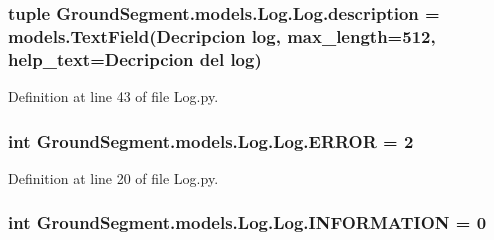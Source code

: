 \subsubsection[{description}]{\setlength{\rightskip}{0pt plus 5cm}tuple Ground\+Segment.\+models.\+Log.\+Log.\+description = models.\+Text\+Field(\textquotesingle{}Decripcion log\textquotesingle{}, max\+\_\+length=512, help\+\_\+text=\textquotesingle{}Decripcion del log\textquotesingle{})\hspace{0.3cm}{\ttfamily [static]}}\label{class_ground_segment_1_1models_1_1_log_1_1_log_aec39855e51031089ade633107205980c}


Definition at line 43 of file Log.\+py.

\hypertarget{class_ground_segment_1_1models_1_1_log_1_1_log_a2a3ccda2ab71251c423d1ca45863f699}{}
\subsubsection[{E\+R\+R\+O\+R}]{\setlength{\rightskip}{0pt plus 5cm}int Ground\+Segment.\+models.\+Log.\+Log.\+E\+R\+R\+O\+R = 2\hspace{0.3cm}{\ttfamily [static]}}\label{class_ground_segment_1_1models_1_1_log_1_1_log_a2a3ccda2ab71251c423d1ca45863f699}


Definition at line 20 of file Log.\+py.

\hypertarget{class_ground_segment_1_1models_1_1_log_1_1_log_ac016eb00e329747a1632e3109e7e7426}{}
\subsubsection[{I\+N\+F\+O\+R\+M\+A\+T\+I\+O\+N}]{\setlength{\rightskip}{0pt plus 5cm}int Ground\+Segment.\+models.\+Log.\+Log.\+I\+N\+F\+O\+R\+M\+A\+T\+I\+O\+N = 0\hspace{0.3cm}{\ttfamily [static]}}\label{class_ground_segment_1_1models_1_1_log_1_1_log_ac016eb00e329747a1632e3109e7e7426}


